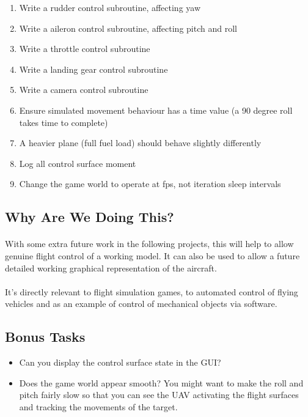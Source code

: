 \documentclass[11pt]{book}
\begin{document}
\begin{enumerate}
\item Write a rudder control subroutine, affecting yaw
\item Write a aileron control subroutine, affecting pitch and roll
\item Write a throttle control subroutine
\item Write a landing gear control subroutine
\item Write a camera control subroutine
\item Ensure simulated movement behaviour has a time value (a 90 degree roll takes time to complete)
\item A heavier plane (full fuel load) should behave slightly differently
\item Log all control surface moment
\item Change the game world to operate at fps, not iteration sleep intervals
\end{enumerate}

\subsection{Why Are We Doing This?}

\paragraph{} With some extra future work in the following projects, this will help to allow genuine flight control of a working model. It can also be used to allow a future detailed working graphical representation of the aircraft.

\paragraph{} It's directly relevant to flight simulation games, to automated control of flying vehicles and as an example of control of mechanical objects via software.

\subsection{Bonus Tasks}

\begin{itemize}
\item Can you display the control surface state in the GUI?
\item Does the game world appear smooth? You might want to make the roll and pitch fairly slow so that you can see the UAV activating the flight surfaces and tracking the movements of the target.
\end{itemize}
\end{document}
